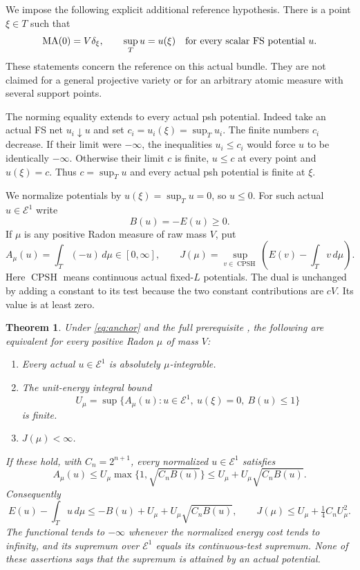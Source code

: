 \documentclass[11pt]{article}
\newtheorem{theorem}{Theorem}
\newcommand{\MA}{\operatorname{MA}}
\newcommand{\E}{\mathcal E}
\newcommand{\CPSH}{\operatorname{CPSH}}
\begin{document}
We impose the following explicit additional reference hypothesis.
There is a point $\xi\in T$ such that
\begin{equation}\label{eq:anchor}
 \MA(0)=V\delta_\xi,\qquad
 \sup_T u=u(\xi)\quad\hbox{for every scalar FS potential }u.
\end{equation}
These statements concern the reference on this actual bundle.
They are not claimed for a general projective variety or for an
arbitrary atomic measure with several support points.

The norming equality extends to every actual psh potential.
Indeed take an actual FS net $u_i\downarrow u$ and set
$c_i=u_i(\xi)=\sup_Tu_i$. The finite numbers $c_i$ decrease.
If their limit were $-\infty$, the inequalities $u_i\leq c_i$
would force $u$ to be identically $-\infty$. Otherwise their limit
$c$ is finite, $u\leq c$ at every point and $u(\xi)=c$.
Thus $c=\sup_Tu$ and every actual psh potential is finite at $\xi$.

We normalize potentials by $u(\xi)=\sup_Tu=0$, so $u\leq0$.
For such actual $u\in\E^1$ write
\[
                 B(u)=-E(u)\geq0.
\]
If $\mu$ is any positive Radon measure of raw mass $V$, put
\[
 A_\mu(u)=\int_T(-u)\,d\mu\in[0,\infty],\qquad
 J(\mu)=\sup_{v\in\CPSH}\left(E(v)-\int_Tv\,d\mu\right).
\]
Here $\CPSH$ means continuous actual fixed-$L$ potentials. The dual
is unchanged by adding a constant to its test because the two
constant contributions are $cV$. Its value is at least zero.

\begin{theorem}\label{thm:criterion}
Under \eqref{eq:anchor} and the full prerequisite \cite{O}, the
following are equivalent for every positive Radon $\mu$ of mass $V$:
\begin{enumerate}
\item Every actual $u\in\E^1$ is absolutely $\mu$-integrable.
\item The unit-energy integral bound
\[
 U_\mu=\sup\{A_\mu(u):u\in\E^1,\ u(\xi)=0,\ B(u)\leq1\}
\]
is finite.
\item $J(\mu)<\infty$.
\end{enumerate}
If these hold, with $C_n=2^{n+1}$, every normalized $u\in\E^1$
satisfies
\begin{equation}\label{eq:sqrt}
 A_\mu(u)\leq U_\mu\max\{1,\sqrt{C_nB(u)}\}
              \leq U_\mu+U_\mu\sqrt{C_nB(u)}.
\end{equation}
Consequently
\begin{equation}\label{eq:coercive}
 E(u)-\int_Tu\,d\mu
       \leq-B(u)+U_\mu+U_\mu\sqrt{C_nB(u)},\qquad
 J(\mu)\leq U_\mu+\tfrac14 C_nU_\mu^2.
\end{equation}
The functional tends to $-\infty$ whenever the normalized energy
cost tends to infinity, and its supremum over $\E^1$ equals its
continuous-test supremum. None of these assertions says that the
supremum is attained by an actual potential.
\end{theorem}
\end{document}
